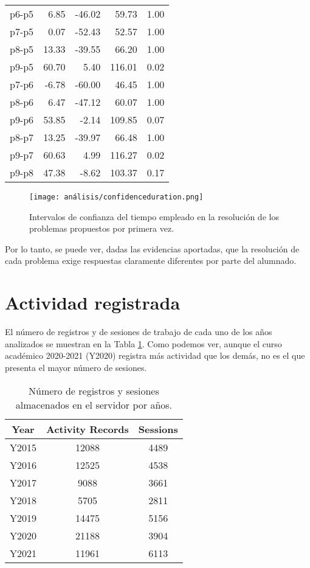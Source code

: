 \begin{table}[H]
\begin{tabular}{rrrrr}
  p6-p5 & 6.85 & -46.02 & 59.73 & 1.00 \\ 
  p7-p5 & 0.07 & -52.43 & 52.57 & 1.00 \\ 
  p8-p5 & 13.33 & -39.55 & 66.20 & 1.00 \\ 
  p9-p5 & 60.70 & 5.40 & 116.01 & 0.02 \\ 
  p7-p6 & -6.78 & -60.00 & 46.45 & 1.00 \\ 
  p8-p6 & 6.47 & -47.12 & 60.07 & 1.00 \\ 
  p9-p6 & 53.85 & -2.14 & 109.85 & 0.07 \\ 
  p8-p7 & 13.25 & -39.97 & 66.48 & 1.00 \\ 
  p9-p7 & 60.63 & 4.99 & 116.27 & 0.02 \\ 
  p9-p8 & 47.38 & -8.62 & 103.37 & 0.17 \\ 
   \hline
\end{tabular}
\end{table}

\begin{figure}[H]
    \centering
    \texttt{[image: análisis/confidenceduration.png]}
    \caption{Intervalos de confianza del tiempo empleado en la resolución de los problemas propuestos por primera vez.}
    \label{fig:confidenceduration}
\end{figure}

Por lo tanto, se puede ver, dadas las evidencias aportadas, que la resolución de cada problema exige respuestas claramente diferentes por parte del alumnado.

\section{Actividad registrada}\label{sec:activityrecorded}

El número de registros y de sesiones de trabajo de cada uno de los años analizados se muestran en la Tabla \ref{tab:records}. Como podemos ver, aunque el curso académico 2020-2021 (Y2020) registra más actividad que los demás, no es el que presenta el mayor número de sesiones.

\begin{table}[H]
\centering
\caption{Número de registros y sesiones almacenados en el servidor por años.}
\label{tab:records}
\begin{tabular}{ccc}
\hline
\textbf{Year}  & \textbf{Activity Records} & \textbf{Sessions}  \\ \hline
Y2015 & 12088            &  4489  \\
Y2016 & 12525            &  4538  \\
Y2017 & 9088             &  3661  \\
Y2018 & 5705             &  2811  \\
Y2019 & 14475            &  5156  \\
Y2020 & 21188            &  3904  \\
Y2021 & 11961            &  6113  \\ \hline
\end{tabular}
\end{table}

